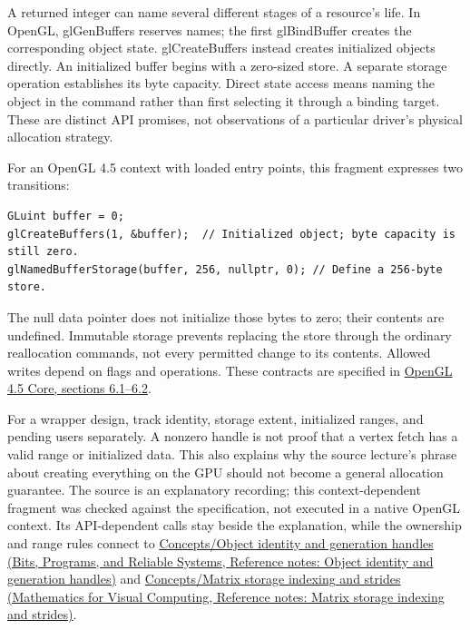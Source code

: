 A returned integer can name several different stages of a resource's life. In OpenGL, glGenBuffers reserves names; the first glBindBuffer creates the corresponding object state. glCreateBuffers instead creates initialized objects directly. An initialized buffer begins with a zero-sized store. A separate storage operation establishes its byte capacity. Direct state access means naming the object in the command rather than first selecting it through a binding target. These are distinct API promises, not observations of a particular driver's physical allocation strategy.

For an OpenGL 4.5 context with loaded entry points, this fragment expresses two transitions:

\begin{verbatim}
GLuint buffer = 0;
glCreateBuffers(1, &buffer);  // Initialized object; byte capacity is still zero.
glNamedBufferStorage(buffer, 256, nullptr, 0); // Define a 256-byte store.
\end{verbatim}

The null data pointer does not initialize those bytes to zero; their contents are undefined. Immutable storage prevents replacing the store through the ordinary reallocation commands, not every permitted change to its contents. Allowed writes depend on flags and operations. These contracts are specified in \href{https://registry.khronos.org/OpenGL/specs/gl/glspec45.core.pdf}{OpenGL 4.5 Core, sections 6.1--6.2}.

For a wrapper design, track identity, storage extent, initialized ranges, and pending users separately. A nonzero handle is not proof that a vertex fetch has a valid range or initialized data. This also explains why the source lecture's phrase about creating everything on the GPU should not become a general allocation guarantee. The source is an explanatory recording; this context-dependent fragment was checked against the specification, not executed in a native OpenGL context. Its API-dependent calls stay beside the explanation, while the ownership and range rules connect to \href{../01-Bits-Programs-and-Reliable-Systems/main.pdf\#nameddest=appendix-f1581457d322}{Concepts/Object identity and generation handles (Bits, Programs, and Reliable Systems, Reference notes: Object identity and generation handles)} and \href{../02-Mathematics-for-Visual-Computing/main.pdf\#nameddest=appendix-ffdc1d4e5350}{Concepts/Matrix storage indexing and strides (Mathematics for Visual Computing, Reference notes: Matrix storage indexing and strides)}.

